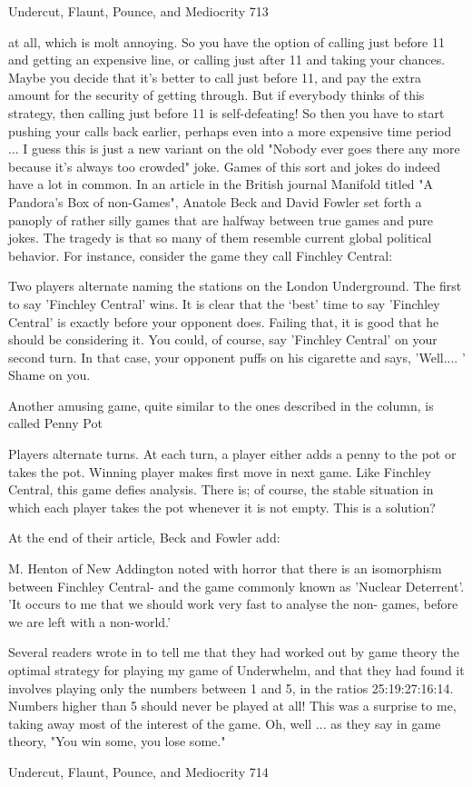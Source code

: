 Undercut, Flaunt, Pounce, and Mediocrity                                            713

at all, which is molt annoying. So you have the option of calling just before 11 and
getting an expensive line, or calling just after 11 and taking your chances. Maybe you
decide that it's better to call just before 11, and pay the extra amount for the security
of getting through. But if everybody thinks of this strategy, then calling just before 11
is self-defeating! So then you have to start pushing your calls back earlier, perhaps
even into a more expensive time period ... I guess this is just a new variant on the old
"Nobody ever goes there any more because it's always too crowded" joke.
        Games of this sort and jokes do indeed have a lot in common. In an article in
the British journal Manifold titled "A Pandora's Box of non-Games", Anatole Beck
and David Fowler set forth a panoply of rather silly games that are halfway between
true games and pure jokes. The tragedy is that so many of them resemble current
global political behavior. For instance, consider the game they call Finchley Central:

   Two players alternate naming the stations on the London Underground. The
   first to say 'Finchley Central' wins. It is clear that the `best' time to say 'Finchley
   Central' is exactly before your opponent does. Failing that, it is good that he
   should be considering it. You could, of course, say 'Finchley Central' on your
   second turn. In that case, your opponent puffs on his cigarette and says, 'Well....
   ' Shame on you.

        Another amusing game, quite similar to the ones described in the column, is
called Penny Pot

   Players alternate turns. At each turn, a player either adds a penny to the pot or
   takes the pot. Winning player makes first move in next game. Like Finchley
   Central, this game defies analysis. There is; of course, the stable situation in
   which each player takes the pot whenever it is not empty. This is a solution?

At the end of their article, Beck and Fowler add:

   M. Henton of New Addington noted with horror that there is an isomorphism
   between Finchley Central- and the game commonly known as 'Nuclear
   Deterrent'. 'It occurs to me that we should work very fast to analyse the non-
   games, before we are left with a non-world.'

        Several readers wrote in to tell me that they had worked out by game theory
the optimal strategy for playing my game of Underwhelm, and that they had found it
involves playing only the numbers between 1 and 5, in the ratios 25:19:27:16:14.
Numbers higher than 5 should never be played at all! This was a surprise to me,
taking away most of the interest of the game. Oh, well ... as they say in game theory,
"You win some, you lose some."




Undercut, Flaunt, Pounce, and Mediocrity                                                 714

